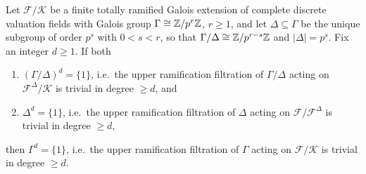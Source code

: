 \documentclass[11pt]{article}
\begin{document}
\begin{lemma}\label{lem:herbrand-convexity}
Let $\mathcal{F}/\mathcal{K}$ be a finite totally ramified Galois extension of
complete discrete valuation fields with Galois group $\Gamma \cong \mathbb{Z}/p^r\mathbb{Z}$,
$r \geq 1$, and let $\Delta \subseteq \Gamma$ be the unique subgroup of order
$p^s$ with $0 < s < r$, so that $\Gamma/\Delta \cong \mathbb{Z}/p^{r-s}\mathbb{Z}$ and
$|\Delta| = p^s$. Fix an integer $d \geq 1$. If both
\begin{enumerate}
  \item[\textnormal{(a)}] $(\Gamma/\Delta)^d = \{1\}$, i.e.\ the upper
        ramification filtration of $\Gamma/\Delta$ acting on
        $\mathcal{F}^\Delta/\mathcal{K}$ is trivial in degree $\geq d$, and
  \item[\textnormal{(b)}] $\Delta^d = \{1\}$, i.e.\ the upper ramification
        filtration of $\Delta$ acting on $\mathcal{F}/\mathcal{F}^\Delta$ is
        trivial in degree $\geq d$,
\end{enumerate}
then $\Gamma^d = \{1\}$, i.e.\ the upper ramification filtration of $\Gamma$
acting on $\mathcal{F}/\mathcal{K}$ is trivial in degree $\geq d$.
\end{lemma}
\end{document}
